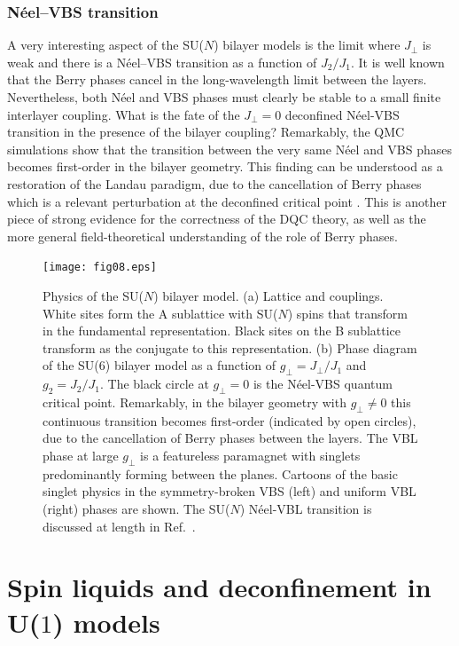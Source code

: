 \documentclass[10pt,pre,aps,twocolumn,showpacs,superscriptaddress,floatfix]{revtex4-1}
\begin{document}
\subsubsection{N\'eel--VBS transition}
A very interesting aspect of the SU($N$) bilayer models is the limit where $J_\perp$ is weak and there is a N\'eel--VBS transition as a function of $J_2/J_1$.
It is well known that the Berry phases cancel in the long-wavelength limit between the layers. Nevertheless, both N\'eel and VBS phases must clearly be stable 
to a small finite interlayer coupling. What is the fate of the $J_\perp=0$ deconfined N\'eel-VBS transition in the presence of the bilayer coupling? Remarkably, 
the QMC simulations show that the transition between the very same N\'eel and VBS phases becomes first-order in the bilayer geometry. This finding can be 
understood as a restoration of the Landau paradigm, due to the cancellation of Berry phases which is a relevant perturbation at the deconfined critical 
point \cite{kaul2012:sun_bil}. This is another piece of strong evidence for the correctness of the DQC theory, as well as the more general field-theoretical 
understanding of the role of Berry phases.

\begin{figure}
\texttt{[image: fig08.eps]}
  \caption{ \label{fig:pd_bil}  Physics of the SU($N$) bilayer model.  (a) Lattice and couplings. White sites form the A sublattice with 
  SU($N$) spins that transform in the fundamental representation. Black sites on the B sublattice transform as the conjugate to this representation. (b) Phase diagram of the
  SU($6$) bilayer model as a function of $g_\perp =J_\perp/J_1$ and $g_2=J_2/J_1$. The black circle at $g_\perp=0$ is the N\'eel-VBS quantum critical point. Remarkably, 
  in the bilayer geometry with $g_\perp\neq 0$ this continuous transition becomes first-order (indicated by open circles), due to the cancellation of Berry phases between 
  the layers. The VBL phase at large $g_\perp$ is a featureless paramagnet with singlets predominantly forming between the planes. Cartoons of the basic singlet physics 
  in the symmetry-broken VBS (left) and uniform VBL (right) phases are shown. The SU($N$) N\'eel-VBL transition is discussed at length in Ref.~\cite{kaul2012:sun_bil}.}
\end{figure}

\section{Spin liquids and deconfinement in U($1$) models}
\label{sec:u1models}
\end{document}
